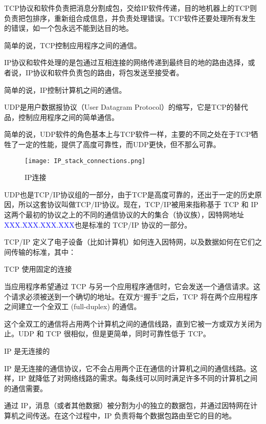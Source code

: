\begin{compactitem}
\item TCP协议和软件负责把消息分割成包，交给IP软件传递，目的地机器上的TCP则负责把包排序，重新组合成信息，并负责处理错误。TCP软件还要处理所有发生的错误，如一个包永远不能到达目的地。

简单的说，TCP控制应用程序之间的通信。

\item IP协议和软件处理的是包通过互相连接的网络传递到最终目的地的路由选择，或者说，IP协议和软件负责包的路由，将包发送至接受者。

简单的说，IP控制计算机之间的通信。


\item UDP是用户数据报协议（User Datagram Protocol）的缩写，它是TCP的替代品，控制应用程序之间的简单通信。

简单的说，UDP软件的角色基本上与TCP软件一样，主要的不同之处在于TCP牺牲了一定的性能，提供了高度可靠性，而UDP更快，但不那么可靠。
\end{compactitem}

\begin{figure}[!h]
\centering
\texttt{[image: IP\_stack\_connections.png]}
\caption{IP连接}
\label{IP_stack_connections}
\end{figure}



UDP也是TCP/IP协议组的一部分，由于TCP是高度可靠的，还出于一定的历史原因，所以这套协议叫做TCP/IP协议。现在，TCP/IP被用来指称基于 TCP 和 IP 这两个最初的协议之上的不同的通信协议的大的集合（协议族），因特网地址\textcolor{Blue}{XXX.XXX.XXX.XXX}也是标准的 TCP/IP 协议的一部分。




TCP/IP 定义了电子设备（比如计算机）如何连入因特网，以及数据如何在它们之间传输的标准，其中：

\begin{compactitem}
\item TCP 使用固定的连接

当应用程序希望通过 TCP 与另一个应用程序通信时，它会发送一个通信请求。这个请求必须被送到一个确切的地址。在双方“握手”之后，TCP 将在两个应用程序之间建立一个全双工 (full-duplex) 的通信。

这个全双工的通信将占用两个计算机之间的通信线路，直到它被一方或双方关闭为止。UDP 和 TCP 很相似，但是更简单，同时可靠性低于 TCP。

\item IP 是无连接的

IP 是无连接的通信协议，它不会占用两个正在通信的计算机之间的通信线路。这样，IP 就降低了对网络线路的需求。每条线可以同时满足许多不同的计算机之间的通信需要。

通过 IP，消息（或者其他数据）被分割为小的独立的数据包，并通过因特网在计算机之间传送。在这个过程中，IP 负责将每个数据包路由至它的目的地。
\end{compactitem}


